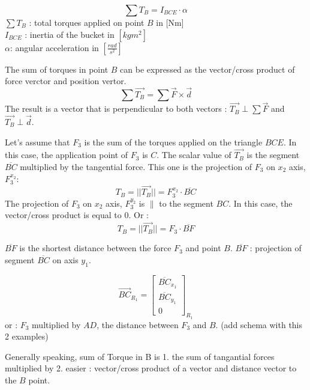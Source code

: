\documentclass[12pt,a4paper]{article}
\begin{document}
\newpage
\begin{equation}
    \sum T_B = I_{BCE} \cdot \alpha
\end{equation}
$\sum T_B$ : total torques applied on point $B$ in [Nm]\\
$I_{BCE}$ : inertia of the bucket in $[kg m^2]$\\
$\alpha$: angular acceleration in $[\frac{rad}{s^2}] $

The sum of torques in point $B$ can be expressed as the vector/cross product of force verctor and position vertor.
\begin{equation}
    \sum \vec{T_B} = \sum \vec{F} \times \vec{d}
\end{equation}
The result is a vector that is perpendicular to both vectors :
$\vec{T_B} \perp \sum \vec{F}$ and
$\vec{T_B} \perp \vec{d}$.

Let's assume that $F_3$ is the sum of the torques applied on the triangle $BCE$. In this case, the application point of $F_3$ is $C$. The scalar value of $\vec{T_B}$ is  the segment $\overline{BC}$ multiplied by the tangential force. This one is the projection of $F_3$ on $x_2$ axis, $F_3^{x_2}$:
\begin{equation}
    T_B=||\vec{T_B}|| = F_3^{x_2} \cdot \overline{BC}
\end{equation}
The projection of $F_3$ on $x_2$ axis, $F_3^{y_2}$ is $\parallel$ to the segment $BC$. In this case, the vector/cross product is equal to $0$.
Or :
\begin{equation}
    T_B=||\vec{T_B}|| = F_3 \cdot \overline{BF}
\end{equation}

$\overline{B F}$ is the shortest distance between the force $F_3$ and point $B$.
$\overline{B F}$ : projection of segment $\overline{BC}$ on axis $y_1$.

\begin{equation}
    \vec{BC}_{R_{1}}=
    \begin{bmatrix}
        \overline{BC}_{x_1} \\
        \overline{BC}_{y_1}\\
        0
    \end{bmatrix}_{R_{1}}
\end{equation}
or : $F_3$ multiplied by $AD$, the distance between $F_3$ and $B$. (add schema with this 2 examples)

Generally speaking, sum of Torque in B is
1. the sum of tangantial forces multiplied by
2. easier : vector/cross product of a vector and distance vector to the $B$ point.
\end{document}
